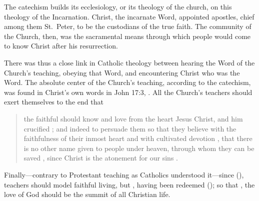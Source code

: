The catechism builds its ecclesiology, or its theology of the church, on this 
theology of the Incarnation.
Christ, the incarnate Word, appointed apostles, chief among them St.\ Peter, to 
be the custodians of the true faith.
The community of the Church, then, was the sacramental means through which 
people would come to know Christ after his resurrection.

There was thus a close link in Catholic theology between hearing the Word of 
the Church's teaching, obeying that Word, and encountering Christ who was the 
Word.
The absolute center of the Church's teaching, according to the catechism, was 
found in Christ's own words in John 17:3, .%
   \Autocite
   [6: .]
   {Catholic:Catechismus1614}
All the Church's teachers should exert themselves to the end that 
    \begin{quote}
        the faithful should know and love from the heart Jesus Christ, and him 
        crucified ; and indeed to persuade them so that they 
        believe with the faithfulness  of their inmost heart and 
        with cultivated devotion , that there is no other name 
        given to people under heaven, through whom they can be saved 
        , since Christ is the atonement for our sins 
        .%
            \Autocite
            [6: .]
            {Catholic:Catechismus1614}
    \end{quote}
Finally---contrary to Protestant teaching as Catholics understood it---since 
(), teachers should model faithful living,  but , having been redeemed  
(); so that , the love of God should be the summit of all Christian 
life.%
    \Autocite[6--7: ]
    {Catholic:Catechismus1614}

